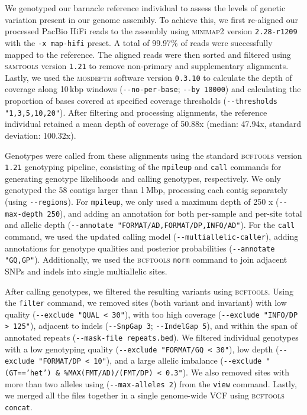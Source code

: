 We genotyped our barnacle reference individual to assess the levels of genetic variation
present in our genome assembly.
To achieve this, we first re-aligned our processed PacBio HiFi reads to the assembly using
\textsc{minimap2} version \texttt{2.28-r1209} with the \texttt{-x map-hifi} preset.
A total of 99.97\% of reads were successfully mapped to the reference.
The aligned reads were then sorted and filtered using \textsc{samtools} version \texttt{1.21}
to remove non-primary and supplementary alignments.
Lastly, we used the \textsc{mosdepth} software version \texttt{0.3.10}
\citep{pedersen_mosdepth_2018} to calculate the depth of coverage along 10\,kbp windows
(\texttt{-{}-no-per-base}; \texttt{-{}-by 10000}) and calculating the proportion of bases
covered at specified coverage thresholds (\texttt{-{}-thresholds "1,3,5,10,20"}).
After filtering and processing alignments, the reference individual retained a mean
depth of coverage of 50.88x (median: 47.94x, standard deviation: 100.32x).
\vspace{0.1cm}

Genotypes were called from these alignments using the standard \textsc{bcftools} version
\texttt{1.21} \citep{danecek_bcftools_2021} genotyping pipeline, consisting of the
\texttt{mpileup} and \texttt{call} commands for generating genotype likelihoods and calling
genotypes, respectively.
We only genotyped the 58 contigs larger than 1\,Mbp, processing each contig separately
(using \texttt{-{}-regions}).
For \texttt{mpileup}, we only used a maximum depth of 250 x (\texttt{-{}-max-depth 250}),
and adding an annotation for both per-sample and per-site total and allelic depth
(\texttt{-{}-annotate "FORMAT/AD,FORMAT/DP,INFO/AD"}).
For the \texttt{call} command, we used the updated calling model
(\texttt{-{}-multiallelic-caller}), adding annotations for genotype qualities and posterior
probabilities (\texttt{-{}-annotate "GQ,GP"}).
Additionally, we used the \textsc{bcftools} \texttt{norm} command to join adjacent SNPs
and indels into single multiallelic sites.
\vspace{0.1cm}

After calling genotypes, we filtered the resulting variants using \textsc{bcftools}.
Using the \texttt{filter} command, we removed sites (both variant and invariant) with
low quality (\texttt{-{}-exclude "QUAL < 30"}), with too high coverage (\texttt{-{}-exclude
"INFO/DP > 125"}), adjacent to indels (\texttt{-{}-SnpGap 3}; \texttt{-{}-IndelGap 5}), and
within the span of annotated repeats (\texttt{-{}-mask-file repeats.bed}). We filtered
individual genotypes with a low genotyping quality (\texttt{-{}-exclude "FORMAT/GQ < 30"}),
low depth (\texttt{-{}-exclude "FORMAT/DP < 10"}), and a large allelic imbalance
(\texttt{-{}-exclude "(GT=='het') \& \%MAX(FMT/AD)/(FMT/DP) < 0.3"}).
We also removed sites with more than two alleles using (\texttt{-{}-max-alleles 2}) from
the \texttt{view} command.
Lastly, we merged all the files together in a single genome-wide VCF using
\textsc{bcftools} \texttt{concat}.
\vspace{0.1cm}

